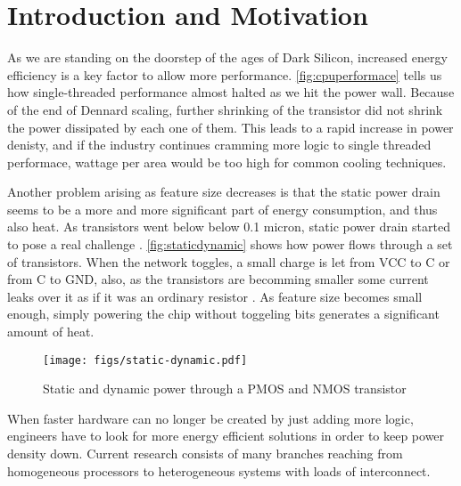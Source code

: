 \section{Introduction and Motivation}







As we are standing on the doorstep of the ages of Dark Silicon,
increased energy efficiency is a key factor to allow more performance.
\autoref{fig:cpuperformace} tells us how single-threaded performance
almost halted as we hit the power wall. Because of the end of Dennard
scaling, further shrinking of the transistor did not shrink the power
dissipated by each one of them. This leads to a rapid increase in
power denisty, and if the industry continues cramming more logic to
single threaded performace, wattage per area would be too high
for common cooling techniques.

Another problem arising as feature size decreases is that the
static power drain seems to be a more and more significant part of energy
consumption, and thus also heat. As transistors went below below 0.1 micron,
static power drain started to pose a real challenge
\cite{kim2003leakage,martin2002combined}.  \autoref{fig:staticdynamic} shows how
power flows through a set of transistors. When the network toggles, a small
charge is let from VCC to C or from C to GND, also, as the transistors are
becomming smaller some current leaks over it as if it was an ordinary resistor
\cite{wolf}. As feature size becomes small enough, simply powering the chip
without toggeling bits generates a significant amount of heat.


\begin{figure}
    \centering
    \texttt{[image: figs/static-dynamic.pdf]}
    \caption{Static and dynamic power through a PMOS and NMOS transistor}
    \label{fig:staticdynamic}
\end{figure}



When faster hardware can no longer be created by just adding more
logic, engineers have to look for more energy efficient solutions
in order to keep power density down. Current research consists of
many branches reaching from homogeneous processors to heterogeneous
systems with loads of interconnect.


